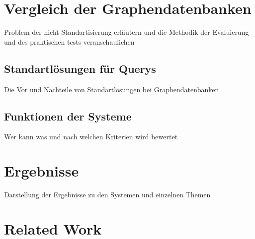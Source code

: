 \documentclass[a4paper,12pt,headsepline]{report}
\begin{document}
\chapter{Vergleich der Graphendatenbanken}
Problem der nicht Standartisierung erläutern und die Methodik der Evaluierung und des praktischen tests veranschaulichen
\section{Standartlösungen für Querys}
Die Vor und Nachteile von Standartlösungen bei Graphendatenbanken
\section{Funktionen der Systeme}
Wer kann was und nach welchen Kriterien wird bewertet 


\chapter{Ergebnisse}
Darstellung der Ergebnisse zu den Systemen und einzelnen Themen

\chapter{Related Work}
\cite{Robinson2015}
\cite{Angles2012}
\cite{Liu2009}


	
\end{document}
